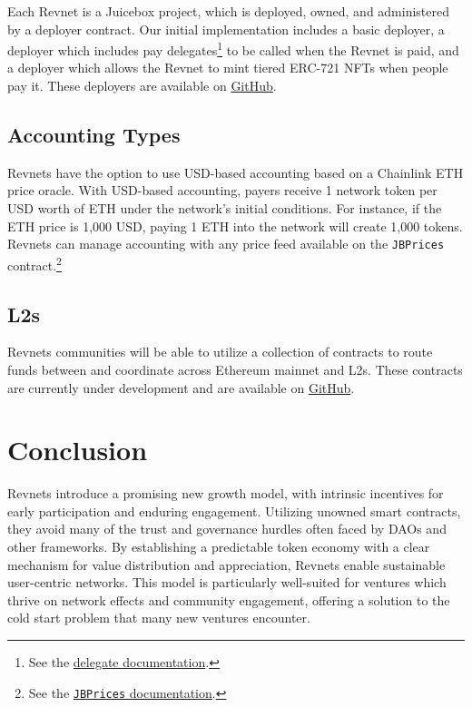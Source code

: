 \documentclass{article}
\begin{document}
Each Revnet is a Juicebox project, which is deployed, owned, and administered by a deployer contract. Our initial implementation includes a basic deployer, a deployer which includes pay delegates\footnote{See the \href{https://docs.juicebox.money/dev/learn/glossary/delegate/}{delegate documentation}.} to be called when the Revnet is paid, and a deployer which allows the Revnet to mint tiered ERC-721 NFTs when people pay it. These deployers are available on \href{https://github.com/rev-net/revnet-contracts}{GitHub}.

\subsection{Accounting Types}\label{sec:accounting_types}

Revnets have the option to use USD-based accounting based on a Chainlink ETH price oracle. With USD-based accounting, payers receive 1 network token per USD worth of ETH under the network's initial conditions. For instance, if the ETH price is 1,000 USD, paying 1 ETH into the network will create 1,000 tokens. Revnets can manage accounting with any price feed available on the \texttt{JBPrices} contract.\footnote{See the \href{https://docs.juicebox.money/dev/api/contracts/jbprices/}{\texttt{JBPrices} documentation}.}

\subsection{L2s}

Revnets communities will be able to utilize a collection of contracts to route funds between and coordinate across Ethereum mainnet and L2s. These contracts are currently under development and are available on \href{https://github.com/Bananapus}{GitHub}.

\section{Conclusion}

Revnets introduce a promising new growth model, with intrinsic incentives for early participation and enduring engagement. Utilizing unowned smart contracts, they avoid many of the trust and governance hurdles often faced by DAOs and other frameworks. By establishing a predictable token economy with a clear mechanism for value distribution and appreciation, Revnets enable sustainable user-centric networks. This model is particularly well-suited for ventures which thrive on network effects and community engagement, offering a solution to the cold start problem that many new ventures encounter.
\end{document}

